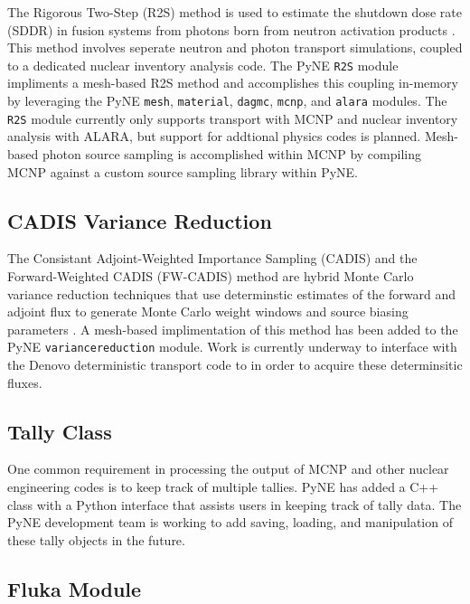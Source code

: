 \documentclass{anstrans}
\begin{document}
The Rigorous Two-Step (R2S) method is used to estimate the shutdown dose rate
(SDDR) in fusion systems from photons born from neutron activation products
\cite{chen_rigorous_2002}. This method involves seperate neutron and photon
transport simulations, coupled to a dedicated nuclear inventory analysis code.
The PyNE \texttt{R2S} module impliments a mesh-based R2S method and
accomplishes this coupling in-memory by leveraging the PyNE \texttt{mesh},
\texttt{material}, \texttt{dagmc}, \texttt{mcnp}, and \texttt{alara} modules.
The \texttt{R2S} module currently only supports transport with MCNP and nuclear
inventory analysis with ALARA, but support for addtional physics codes is
planned. Mesh-based photon source sampling is accomplished within MCNP by
compiling MCNP against a custom source sampling library within PyNE.


\subsection{CADIS Variance Reduction}

The Consistant Adjoint-Weighted Importance Sampling (CADIS) and the
Forward-Weighted CADIS (FW-CADIS) method are hybrid Monte Carlo variance reduction
techniques that use determinstic estimates of the forward and adjoint flux to
generate Monte Carlo weight windows and source biasing parameters
\cite{haghighat_monte_2003}. A mesh-based implimentation of this method has
been added to the PyNE \texttt{variancereduction} module. Work is currently
underway to interface with the Denovo \cite{Evans2010} deterministic transport
code to in order to acquire these determinsitic fluxes.


\subsection{Tally Class}

One common requirement in processing the output of MCNP and other nuclear
engineering codes is to keep track of multiple tallies. PyNE has added a
C++ class with a Python interface that assists users in keeping track of
tally data. The PyNE development team is working to add saving, loading,
and manipulation of these tally objects in the future.

\subsection{Fluka Module}
\end{document}
